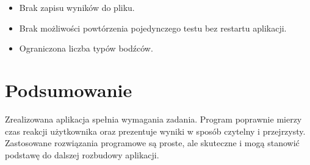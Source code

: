 \documentclass[12pt,a4paper]{article}
\begin{document}
\begin{itemize}
    \item Brak zapisu wyników do pliku.
    \item Brak możliwości powtórzenia pojedynczego testu bez restartu aplikacji.
    \item Ograniczona liczba typów bodźców.
\end{itemize}

\section{Podsumowanie}

Zrealizowana aplikacja spełnia wymagania zadania. Program poprawnie mierzy czas reakcji użytkownika oraz prezentuje wyniki w sposób czytelny i przejrzysty. Zastosowane rozwiązania programowe są proste, ale skuteczne i mogą stanowić podstawę do dalszej rozbudowy aplikacji.
\end{document}

